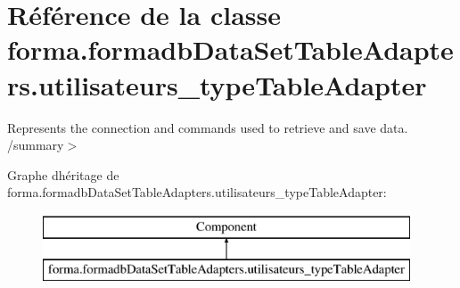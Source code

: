 \hypertarget{classforma_1_1formadb_data_set_table_adapters_1_1utilisateurs__type_table_adapter}{}\section{Référence de la classe forma.\+formadb\+Data\+Set\+Table\+Adapters.\+utilisateurs\+\_\+type\+Table\+Adapter}
\label{classforma_1_1formadb_data_set_table_adapters_1_1utilisateurs__type_table_adapter}


Represents the connection and commands used to retrieve and save data. /summary$>$  


Graphe d\textquotesingle{}héritage de forma.\+formadb\+Data\+Set\+Table\+Adapters.\+utilisateurs\+\_\+type\+Table\+Adapter\+:\begin{figure}[H]
\begin{center}
\leavevmode
\includegraphics[height=2.000000cm]{classforma_1_1formadb_data_set_table_adapters_1_1utilisateurs__type_table_adapter}
\end{center}
\end{figure}
